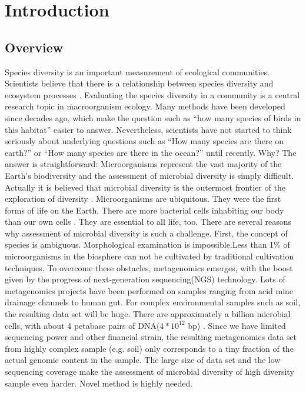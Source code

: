 \chapter{Introduction}

\section{Overview}
Species diversity is an important measurement of ecological communities. 
Scientists believe that there is a relationship between species diversity and 
ecosystem processes \cite{Loreau:2001aa}. Evaluating the species diversity in a
community is a central research topic in macroorganism ecology. Many methods 
have been developed since decades ago, which make the question such as ``how many 
species of birds in this habitat'' easier to answer. Nevertheless, scientists 
have not started to think seriously about underlying questions such as ``How many 
species are there on earth?'' \cite{May:1988aa} or ``How many species are there 
in the ocean?'' \cite{Mora:2011aa} until recently. Why? The answer is 
straightforward: Microorganisms represent the vast majority of the Earth's 
biodiversity and the assessment of microbial diversity is simply difficult. 
Actually it is believed that microbial diversity is the outermost frontier of 
the exploration of diversity \cite{magurran2011biological}. Microorganisms are 
ubiquitous. They were the first forms of life on the Earth. There are more 
bacterial cells inhabiting our body than our own cells \cite{Savage:1977aa}.
They are essential to all life, too. There are several reasons why assessment 
of microbial diversity is such a challenge. First, the concept of species is 
ambiguous. Morphological examination is impossible.Less than 1\% of 
microorganisms  in the biosphere can not be cultivated by traditional cultivation
techniques\cite{Curtis:2002aa}. To overcome these obstacles, 
metagenomics emerges, with the boost given by the progress of next-generation 
sequencing(NGS) technology. Lots of metagenomics projects have been performed on 
samples ranging from acid mine drainage channels to human gut. For complex 
environmental samples 
such as soil, the resulting data set will be huge. There are approximately a 
billion microbial cells, with about 4 petabase pairs of DNA($4*{10}^{12}$ bp) \cite{Zarraonaindia:2013aa}. 
Since we have limited sequencing power and other financial strain, the 
resulting metagenomics data set from highly complex sample (e.g. soil) only 
corresponds to a tiny fraction of the actual genomic content in the sample. 
The large size of data set and the low sequencing coverage make the assessment of 
microbial diversity of high diversity sample even harder. Novel method is 
highly needed. 


